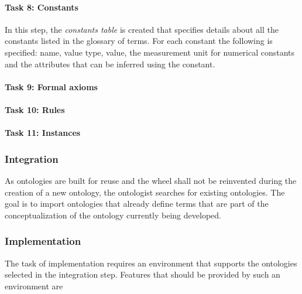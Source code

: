 \paragraph{Task 8: Constants}

In this step, the \emph{constants table} is created that specifies details about all the constants listed in the glossary of terms. For each constant the following is specified: name, value type, value, the measurement unit for numerical constants and the attributes that can be inferred using the constant.

\paragraph{Task 9: Formal axioms}


\paragraph{Task 10: Rules}


\paragraph{Task 11: Instances}


\subsubsection{Integration}

As ontologies are built for reuse and the wheel shall not be reinvented during the creation of a new ontology, the ontologist searches for existing ontologies. The goal is to import ontologies that already define terms that are part of the conceptualization of the ontology currently being developed.

\subsubsection{Implementation}

The task of implementation requires an environment that supports the ontologies selected in the integration step. Features that should be provided by such an environment are

